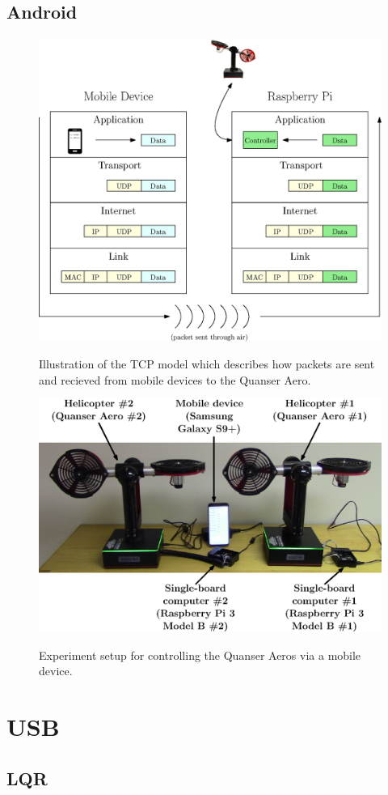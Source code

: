 \subsection{Android}
\begin{figure}[!htbp]
    \centering
    \includegraphics[width=.46\textwidth,keepaspectratio=true]{figs/ipe/TCPModel.eps}
    \label{fig:TCPModel}
    \caption{Illustration of the TCP model which describes how packets are sent and recieved from mobile devices to the Quanser Aero.}
\end{figure}

\begin{figure}[!htbp]
    \centering
    \includegraphics[width=.5\textwidth,keepaspectratio=true]{figs/ipe/Setup.eps}
    \label{fig:Setup}
    \caption{Experiment setup for controlling the Quanser Aeros via a mobile device.}
\end{figure}


\section{USB}

\subsection{LQR}

